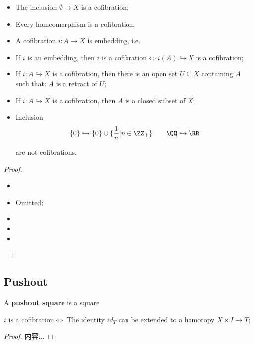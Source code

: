 \documentclass[Total.tex]{subfiles}
\begin{document}
				\begin{proposition}
					\begin{itemize}
						\item The inclusion $\emptyset\rightarrow X$ is a cofibration;
						\item Every homeomorphism is a cofibration;
						\item A cofibration $i:A\rightarrow X$ is embedding, i.e.
						\item If $i$ is an embedding, then $i$ is a cofibration$\Leftrightarrow i(A)\hookrightarrow X$ is a cofibration;
						\item If $i:A\hookrightarrow X$ is a cofibration, then there is an open set $U\subseteq X$ containing $A$ such that: $A$ is a retract of $U$;
						\item If $i:A\hookrightarrow X$ is a cofibration, then $A$ is a closed subset of $X$;
						\item Inclusion
						\begin{gather*}
							\{0\}\hookrightarrow \{0\}\cup \{\frac{1}{n}|n\in \ZZ_+\}\qquad \QQ\hookrightarrow \RR
						\end{gather*}
						
						are not cofibrations.
					\end{itemize}
				\end{proposition}
				\begin{proof}
					\begin{itemize}
						\item 
						\item Omitted;
						\item 
						\item 
						\item 
					\end{itemize}
				\end{proof}
				
				\subsection{Pushout}
					\begin{Def}
						A \textbf{pushout square} is a square
						\begin{center}
						\end{center}
					\end{Def}
					\begin{proposition}
						$i$ is a cofibration$\Leftrightarrow$ The identity $id_T$ can be extended to a homotopy $X\times I\rightarrow T$;
					\end{proposition}
					\begin{proof}
						内容...
					\end{proof}
					
\end{document}
